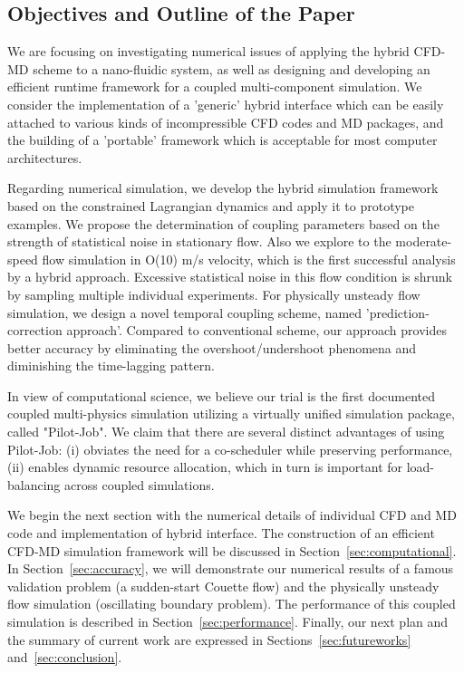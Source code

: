 \documentclass[preprint,12pt]{elsarticle}
\begin{document}
\subsection{Objectives and Outline of the Paper}

We are focusing on investigating numerical issues of applying the hybrid CFD-MD scheme to a nano-fluidic system, as well as designing and developing an efficient runtime framework for a coupled multi-component simulation. We consider the implementation of a 'generic' hybrid interface which can be easily attached to various kinds of incompressible CFD codes and MD packages, and the building of a 'portable' framework which is acceptable for most computer architectures. 

Regarding numerical simulation, we develop the hybrid simulation framework based on the constrained Lagrangian dynamics and apply it to prototype examples. We propose the determination of coupling parameters based on the strength of statistical noise in stationary flow. Also we explore to the moderate-speed flow simulation in O(10) m/s velocity, which is the first successful analysis by a hybrid approach. Excessive statistical noise in this flow condition is shrunk by sampling multiple individual experiments. For physically unsteady flow simulation, we design a novel temporal coupling scheme, named 'prediction-correction approach'. Compared to conventional scheme, our approach provides better accuracy by eliminating the overshoot/undershoot phenomena and diminishing the time-lagging pattern.

In view of computational science, we believe our trial is the first documented coupled multi-physics simulation utilizing a virtually unified simulation package, called "Pilot-Job". We claim that there are several distinct advantages of using Pilot-Job: (i) obviates the need for a co-scheduler while preserving performance, (ii) enables dynamic resource allocation, which in turn is important for load-balancing across coupled simulations. %

We begin the next section with the numerical details of individual CFD and MD code and implementation of hybrid interface. The construction of an efficient CFD-MD simulation framework will be discussed in Section~\ref{sec:computational}. In Section~\ref{sec:accuracy}, we will demonstrate our numerical results of a famous validation problem (a sudden-start Couette flow) and the physically unsteady flow simulation (oscillating boundary problem). The performance of this coupled simulation is described in Section~\ref{sec:performance}. Finally, our next plan and the summary of current work are expressed in Sections~\ref{sec:futureworks} and~\ref{sec:conclusion}.
\end{document}
